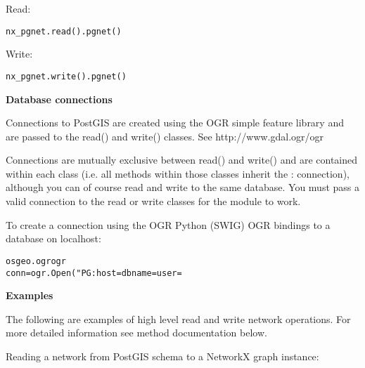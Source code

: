 Read:

\begin{alltt}
\pysrcprompt{{\textgreater}{\textgreater}{\textgreater} }nx\_pgnet.read().pgnet()
\pysrcprompt{{\textgreater}{\textgreater}{\textgreater} }\end{alltt}
Write:

\begin{alltt}
\pysrcprompt{{\textgreater}{\textgreater}{\textgreater} }nx\_pgnet.write().pgnet()
\pysrcprompt{{\textgreater}{\textgreater}{\textgreater} }\end{alltt}
\textbf{Database connections}

Connections to PostGIS are created using the OGR simple feature library and
are passed to the read() and write() classes. See http://www.gdal.ogr/ogr

Connections are mutually exclusive between read() and write() and are 
contained within each class (i.e. all methods within those classes inherit 
the : connection), although you can of course read and write to the same 
database. You must pass a valid connection to the read or write classes for
the module to work.

To create a connection using the OGR Python (SWIG) OGR bindings to a 
database on localhost:

\begin{alltt}
\pysrcprompt{{\textgreater}{\textgreater}{\textgreater} } osgeo.ogr  ogr
\pysrcprompt{{\textgreater}{\textgreater}{\textgreater} }conn = ogr.Open("PG: host= dbname= user=
\end{alltt}
\textbf{Examples}

The following are examples of high level read and write network operations.
For more detailed information see method documentation below.

Reading a network from PostGIS schema to a NetworkX graph instance:

